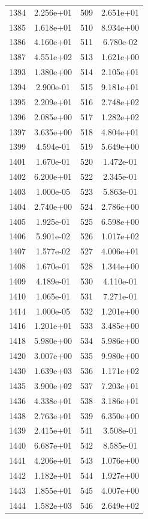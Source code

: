 \documentclass[12pt]{article}
\begin{document}
\begin{longtable}{@{}cccc@{}}
1384 & 2.256e+01 & 509 & 2.651e+01 \\
1385 & 1.618e+01 & 510 & 8.934e+00 \\
1386 & 4.160e+01 & 511 & 6.780e-02 \\
1387 & 4.551e+02 & 513 & 1.621e+00 \\
1393 & 1.380e+00 & 514 & 2.105e+01 \\
1394 & 2.900e-01 & 515 & 9.181e+01 \\
1395 & 2.209e+01 & 516 & 2.748e+02 \\
1396 & 2.085e+00 & 517 & 1.282e+02 \\
1397 & 3.635e+00 & 518 & 4.804e+01 \\
1399 & 4.594e-01 & 519 & 5.649e+00 \\
1401 & 1.670e-01 & 520 & 1.472e-01 \\
1402 & 6.200e+01 & 522 & 2.345e-01 \\
1403 & 1.000e-05 & 523 & 5.863e-01 \\
1404 & 2.740e+00 & 524 & 2.786e+00 \\
1405 & 1.925e-01 & 525 & 6.598e+00 \\
1406 & 5.901e-02 & 526 & 1.017e+02 \\
1407 & 1.577e-02 & 527 & 4.006e+01 \\
1408 & 1.670e-01 & 528 & 1.344e+00 \\
1409 & 4.189e-01 & 530 & 4.110e-01 \\
1410 & 1.065e-01 & 531 & 7.271e-01 \\
1414 & 1.000e-05 & 532 & 1.201e+00 \\
1416 & 1.201e+01 & 533 & 3.485e+00 \\
1418 & 5.980e+00 & 534 & 5.986e+00 \\
1420 & 3.007e+00 & 535 & 9.980e+00 \\
1430 & 1.639e+03 & 536 & 1.171e+02 \\
1435 & 3.900e+02 & 537 & 7.203e+01 \\
1436 & 4.338e+01 & 538 & 3.186e+01 \\
1438 & 2.763e+01 & 539 & 6.350e+00 \\
1439 & 2.415e+01 & 541 & 3.508e-01 \\
1440 & 6.687e+01 & 542 & 8.585e-01 \\
1441 & 4.206e+01 & 543 & 1.076e+00 \\
1442 & 1.182e+01 & 544 & 1.927e+00 \\
1443 & 1.855e+01 & 545 & 4.007e+00 \\
1444 & 1.582e+03 & 546 & 2.649e+02 \\

\end{longtable}
\end{document}
